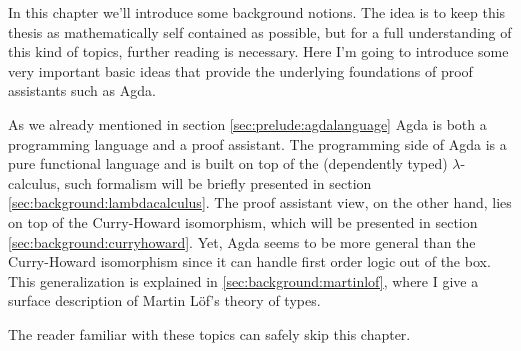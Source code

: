 In this chapter we'll introduce some background notions. The idea is to keep this thesis as
mathematically self contained as possible, but for a full understanding of this kind of topics, further
reading is necessary. Here I'm going to introduce some very important basic ideas that provide
the underlying foundations of proof assistants such as Agda.

As we already mentioned in section \ref{sec:prelude:agdalanguage} Agda is both a programming language and a proof assistant. The programming side of Agda is a pure functional language and is built on top of the (dependently typed) $\lambda$-calculus, such formalism will be briefly presented in section \ref{sec:background:lambdacalculus}. The proof assistant view, on the other hand, lies on top of the Curry-Howard isomorphism, which will be presented in section \ref{sec:background:curryhoward}. Yet, Agda seems to be
more general than the Curry-Howard isomorphism since it can handle first order logic out of the box. 
This generalization is explained in \ref{sec:background:martinlof}, where I give a surface description
of Martin L\"{o}f's theory of types.

The reader familiar with these topics can safely skip this chapter. 
